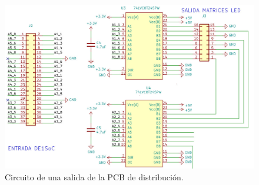 \begin{figure}[htpb]
	\centering
    \includegraphics[scale=0.4]{Figures/circuitodistribucion.jpg} 
	\caption{Circuito de una salida de la PCB de distribución.}
	\label{fig:circuitodistribucion}
\end{figure}

